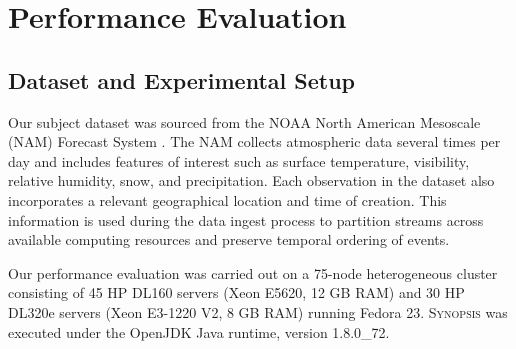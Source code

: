 \section{Performance Evaluation}
\label{sec:performance}

\subsection{Dataset and Experimental Setup}
Our subject dataset was sourced from the NOAA North American Mesoscale (NAM) Forecast System \cite{noaa_nam}.  The NAM collects atmospheric data several times per day and includes features of interest such as surface temperature, visibility, relative humidity, snow, and precipitation. Each observation in the dataset also incorporates a relevant geographical location and time of creation. This information is used during the data ingest process to partition streams across available computing resources and preserve temporal ordering of events.

Our performance evaluation was carried out on a 75-node heterogeneous cluster consisting of 45 HP DL160 servers (Xeon E5620, 12 GB RAM) and 30 HP DL320e servers (Xeon E3-1220 V2, 8 GB RAM) running Fedora 23. \textsc{Synopsis} was executed under the OpenJDK Java runtime, version 1.8.0\_72.

